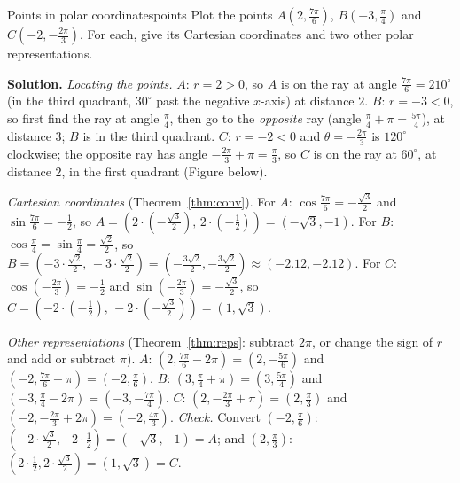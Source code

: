 \documentclass[11pt]{article}
\begin{document}
\begin{exmp}{Points in polar coordinates}{points}
Plot the points $A\left(2,\frac{7\pi}6\right)$, $B\left(-3,\frac\pi4\right)$ and $C\left(-2,-\frac{2\pi}3\right)$. For each, give its Cartesian coordinates and two other polar representations.

\textbf{Solution.} \emph{Locating the points.} $A$: $r=2>0$, so $A$ is on the ray at angle $\frac{7\pi}6=210^\circ$ (in the third quadrant, $30^\circ$ past the negative $x$-axis) at distance $2$. $B$: $r=-3<0$, so first find the ray at angle $\frac\pi4$, then go to the \emph{opposite} ray (angle $\frac\pi4+\pi=\frac{5\pi}4$), at distance $3$; $B$ is in the third quadrant. $C$: $r=-2<0$ and $\theta=-\frac{2\pi}3$ is $120^\circ$ clockwise; the opposite ray has angle $-\frac{2\pi}3+\pi=\frac\pi3$, so $C$ is on the ray at $60^\circ$, at distance $2$, in the first quadrant (Figure below).

\emph{Cartesian coordinates} (Theorem~\ref{thm:conv}). For $A$: $\cos\frac{7\pi}6=-\frac{\sqrt3}2$ and $\sin\frac{7\pi}6=-\frac12$, so $A=\left(2\cdot\left(-\frac{\sqrt3}2\right),\,2\cdot\left(-\frac12\right)\right)=(-\sqrt3,-1)$. For $B$: $\cos\frac\pi4=\sin\frac\pi4=\frac{\sqrt2}2$, so $B=\left(-3\cdot\frac{\sqrt2}2,\,-3\cdot\frac{\sqrt2}2\right)=\left(-\frac{3\sqrt2}2,-\frac{3\sqrt2}2\right)\approx(-2.12,-2.12)$. For $C$: $\cos\left(-\frac{2\pi}3\right)=-\frac12$ and $\sin\left(-\frac{2\pi}3\right)=-\frac{\sqrt3}2$, so $C=\left(-2\cdot\left(-\frac12\right),\,-2\cdot\left(-\frac{\sqrt3}2\right)\right)=(1,\sqrt3)$.

\emph{Other representations} (Theorem~\ref{thm:reps}: subtract $2\pi$, or change the sign of $r$ and add or subtract $\pi$). $A$: $\left(2,\frac{7\pi}6-2\pi\right)=\left(2,-\frac{5\pi}6\right)$ and $\left(-2,\frac{7\pi}6-\pi\right)=\left(-2,\frac\pi6\right)$. $B$: $\left(3,\frac\pi4+\pi\right)=\left(3,\frac{5\pi}4\right)$ and $\left(-3,\frac\pi4-2\pi\right)=\left(-3,-\frac{7\pi}4\right)$. $C$: $\left(2,-\frac{2\pi}3+\pi\right)=\left(2,\frac\pi3\right)$ and $\left(-2,-\frac{2\pi}3+2\pi\right)=\left(-2,\frac{4\pi}3\right)$.
\emph{Check.} Convert $\left(-2,\frac\pi6\right)$: $\left(-2\cdot\frac{\sqrt3}2,-2\cdot\frac12\right)=(-\sqrt3,-1)=A$; and $\left(2,\frac\pi3\right)$: $\left(2\cdot\frac12,2\cdot\frac{\sqrt3}2\right)=(1,\sqrt3)=C$.
\end{exmp}
\end{document}
